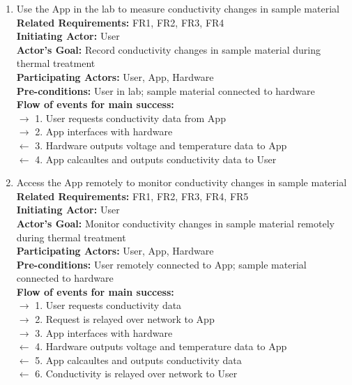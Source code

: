 \documentclass[12pt, titlepage]{article}
\begin{document}
\begin{enumerate}[{UC-}1:]
    
\item Use the App in the lab to measure conductivity changes in sample material\\
    \textbf{Related Requirements:} FR1, FR2, FR3, FR4\\ %
    \textbf{Initiating Actor:} User\\
    \textbf{Actor's Goal:} Record conductivity changes in sample material during thermal treatment\\
    \textbf{Participating Actors:} User, App, Hardware\\
    \textbf{Pre-conditions:} User in lab; sample material connected to hardware\\
    \textbf{Flow of events for main success:}\\
    $\rightarrow$ 1. User requests conductivity data from App\\
    $\rightarrow$ 2. App interfaces with hardware\\
    $\leftarrow$ 3. Hardware outputs voltage and temperature data to App\\
    $\leftarrow$ 4. App calcaultes and outputs conductivity data to User\\

\item Access the App remotely to monitor conductivity changes in sample material\\
    \textbf{Related Requirements:} FR1, FR2, FR3, FR4, FR5\\ %
    \textbf{Initiating Actor:} User\\
    \textbf{Actor's Goal:} Monitor conductivity changes in sample material remotely during thermal treatment\\
    \textbf{Participating Actors:} User, App, Hardware\\
    \textbf{Pre-conditions:} User remotely connected to App; sample material connected to hardware\\
    \textbf{Flow of events for main success:}\\
    $\rightarrow$ 1. User requests conductivity data\\
    $\rightarrow$ 2. Request is relayed over network to App\\
    $\rightarrow$ 3. App interfaces with hardware\\
    $\leftarrow$ 4. Hardware outputs voltage and temperature data to App\\
    $\leftarrow$ 5. App calcaultes and outputs conductivity data\\
    $\leftarrow$ 6. Conductivity is relayed over network to User
    
\color{black}
\end{enumerate}
\end{document}

